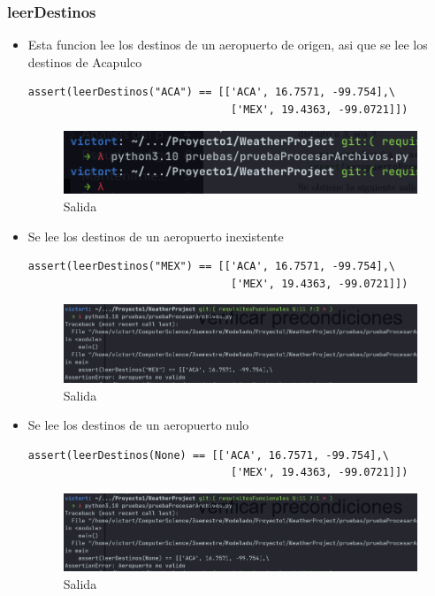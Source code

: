 \documentclass[12pt]{article}
\begin{document}
\subsubsection{leerDestinos}
\begin{itemize}
\item Esta funcion lee los destinos de un aeropuerto de origen, asi que se lee los destinos de Acapulco
\begin{verbatim}
assert(leerDestinos("ACA") == [['ACA', 16.7571, -99.754],\
                                ['MEX', 19.4363, -99.0721]])
\end{verbatim}
  
    \begin{figure}[h!]
    \centering
    \includegraphics[scale=0.8]{pruebasPy/archivos/bien.png}
    \caption{Salida}
  \end{figure}
\item Se lee los destinos de un aeropuerto inexistente
\begin{verbatim}
assert(leerDestinos("MEX") == [['ACA', 16.7571, -99.754],\
                                ['MEX', 19.4363, -99.0721]])
\end{verbatim}
  
    \begin{figure}[h!]
    \centering
    \includegraphics[scale=0.4]{pruebasPy/archivos/aeroMal.png}
    \caption{Salida}
  \end{figure}
\item Se lee los destinos de un aeropuerto nulo
\begin{verbatim}
assert(leerDestinos(None) == [['ACA', 16.7571, -99.754],\
                                ['MEX', 19.4363, -99.0721]])
\end{verbatim}
  
    \begin{figure}[h!]
    \centering
    \includegraphics[scale=0.4]{pruebasPy/archivos/leerNone.png}
    \caption{Salida}
  \end{figure}
\end{itemize}
\end{document}
